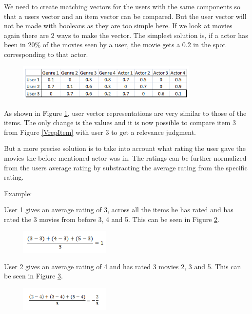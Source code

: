 We need to create matching vectors for the users with the same components so that a users vector and an item vector can be compared. But the user vector will not be made with booleans as they are too simple here. If we look at movies again there are 2 ways to make the vector. The simplest solution is, if a actor has been in 20\% of the movies seen by a user, the movie gets a 0.2 in the spot corresponding to that actor.

\begin{figure}[H]
\centering
\includegraphics[width=0.8\textwidth]{Images/VectorrepresentationUsers.png}
\caption{}
\label{VrepUser}
\end{figure}

As shown in Figure \ref{VrepUser}, user vector representations are very similar to those of the items. The only change is the values and it is now possible to compare item 3 from Figure \ref{VrepItem} with user 3 to get a relevance judgment.

But a more precise solution is to take into account what rating the user gave the movies the before mentioned actor was in. The ratings can be further normalized from the users average rating by substracting the average rating from the specific rating.

Example:

User 1 gives an average rating of 3, across all the items he has rated and has rated the 3 movies from before 3, 4 and 5. This can be seen in Figure \ref{Feature1}.

\begin{figure}[H]
\centering
\includegraphics[width=0.4\textwidth]{Images/Userfeature1.png}
\caption{}
\label{Feature1}
\end{figure}

User 2 gives an average rating of 4 and has rated 3 movies 2, 3 and 5. This can be seen in Figure \ref{Feature2}.

\begin{figure}[H]
\centering
\includegraphics[width=0.4\textwidth]{Images/Userfeature2.png}
\caption{}
\label{Feature2}
\end{figure}

